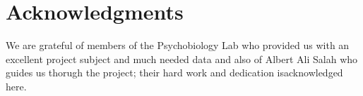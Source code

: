 \cleardoublepage
{}
{}
\chapter*{Acknowledgments}
\vspace{1.0in}
We are grateful of members of the Psychobiology Lab who provided us with an excellent project subject and much needed data and also of Albert Ali Salah who guides us thorugh the project; their hard work and dedication isacknowledged here.
